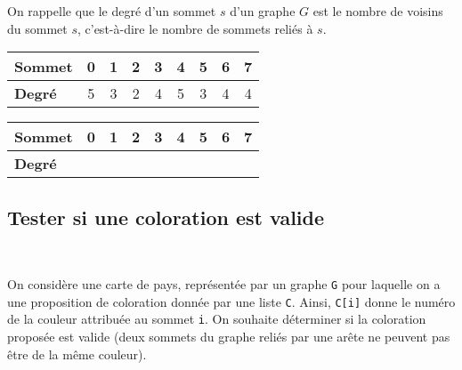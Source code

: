 \ifprof
\else
On rappelle que le degré d'un sommet $s$ d'un graphe $G$ est le nombre de voisins du sommet $s$, c'est-à-dire le nombre de sommets reliés à $s$.
\fi

\ifprof
\begin{corrige}
\begin{center}
\begin{tabular}{lcccccccc}
\hline
\textbf{Sommet} 	& 0 & 1 & 2 & 3 & 4 & 5 & 6 & 7 \\
\hline
\textbf{Degré} 		& 5 & 3 & 2 & 4 & 5 & 3 & 4 & 4\\
\hline
\end{tabular}
\end{center}

\end{corrige}
\else

\begin{center}
\begin{tabular}{lcccccccc}
\hline
\textbf{Sommet} 	& 0 & 1 & 2 & 3 & 4 & 5 & 6 & 7 \\
\hline
\textbf{Degré} 		& & & & & & & & \\
\hline
\end{tabular}
\end{center}
\fi


\subsection{Tester si une coloration est valide}

\ifprof
\begin{corrige}~\\ \vspace{-.5cm}

\end{corrige}
\else
\fi

\ifprof
\else
On considère une carte de pays, représentée par un graphe \lstinline{G} pour laquelle on a une proposition de coloration donnée par une liste \lstinline{C}. Ainsi, \lstinline{C[i]} donne le numéro de la couleur attribuée au sommet \lstinline{i}. On souhaite déterminer si la coloration proposée est valide (deux sommets du graphe reliés par une arête ne peuvent pas être de la même couleur).
\fi

